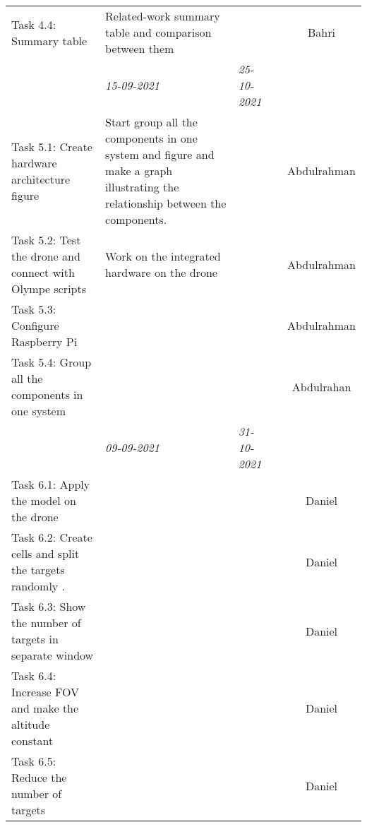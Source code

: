 \begin{center}
\begin{small}
\begin{xltabular}{\textwidth}{ p{3cm} p{5cm} X X c }
            Task 4.4: Summary table
                & Related-work summary table and comparison between them & & & Bahri \\

            \addlinespace
                & \emph{15-09-2021} & \emph{25-10-2021} & 
            \\ \addlinespace

            Task 5.1: Create hardware architecture figure
                & Start group all the components in one system and figure and make a graph illustrating the relationship between the components. & & & Abdulrahman \\

            Task 5.2:  Test the drone and connect with Olympe scripts
                & Work on the integrated hardware on the drone & & & Abdulrahman \\

            Task 5.3: Configure Raspberry Pi 
                & & & & Abdulrahman \\

            Task 5.4: Group all the components in one system 
                & & & & Abdulrahan \\

            \addlinespace
                & \emph{09-09-2021} & \emph{31-10-2021} & 
            \\ \addlinespace

            Task 6.1: Apply the model on the drone
                & & & & Daniel \\

            Task 6.2: Create cells and split the targets randomly . 
                & & & & Daniel \\

            Task 6.3: Show the number of targets in separate window
                & & & & Daniel \\

            Task 6.4: Increase FOV and make the altitude constant 
                & & & & Daniel \\

            Task 6.5: Reduce the number of targets
                & & & & Daniel \\
                

\end{xltabular}
\end{small}
\end{center}
